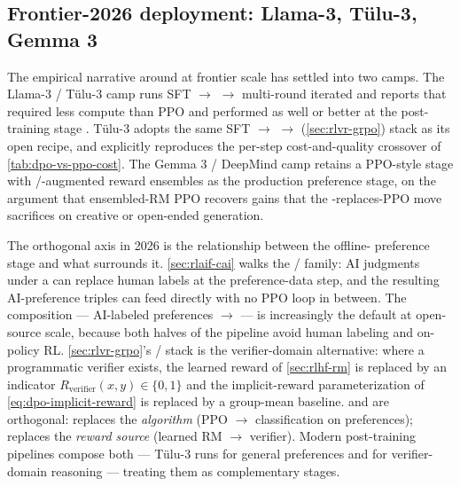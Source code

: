 \subsection{Frontier-2026 deployment: Llama-3, T\"ulu-3, Gemma 3}
\label{sec:dpo-frontier}

The empirical narrative around  at frontier scale has settled into
two camps. The Llama-3 / T\"ulu-3 camp \citep{meta-llama3, tulu3} runs
SFT $\to$  $\to$ multi-round iterated  and
reports that  required less compute than PPO and performed as well
or better at the post-training stage \citep[\S 4]{meta-llama3}. T\"ulu-3
\citep{tulu3} adopts the same SFT $\to$  $\to$ 
(\cref{sec:rlvr-grpo}) stack as its open recipe, and explicitly
reproduces the per-step cost-and-quality crossover of
\cref{tab:dpo-vs-ppo-cost}. The Gemma 3 / DeepMind camp
\citep{gemma3} retains a PPO-style  stage with /-augmented
reward ensembles \citep{warm-2024, warp-2024} as the production
preference stage, on the argument that ensembled-RM PPO recovers gains
that the -replaces-PPO move sacrifices on creative or open-ended
generation.

The orthogonal axis in 2026 is the relationship between the offline-
preference stage and what surrounds it. \cref{sec:rlaif-cai} walks the
 /  \citep{bai2022-cai} family: AI judgments under
a  can replace human labels at the preference-data step,
and the resulting AI-preference triples can feed  directly with no
PPO loop in between. The composition --- AI-labeled preferences
$\to$  --- is increasingly the default at open-source scale,
because both halves of the pipeline avoid human labeling and on-policy
RL. \cref{sec:rlvr-grpo}'s  /  stack is the verifier-domain
alternative: where a programmatic verifier exists, the learned reward
of \cref{sec:rlhf-rm} is replaced by an indicator
$R_{\mathrm{verifier}}(x, y) \in \{0, 1\}$ and the implicit-reward
parameterization of \cref{eq:dpo-implicit-reward} is replaced by a
group-mean baseline.  and  are orthogonal:  replaces the
\emph{algorithm} (PPO $\to$ classification on preferences); 
replaces the \emph{reward source} (learned RM $\to$ verifier). Modern
post-training pipelines compose both --- T\"ulu-3 runs  for general
preferences and  for verifier-domain reasoning --- treating them as
complementary stages.

